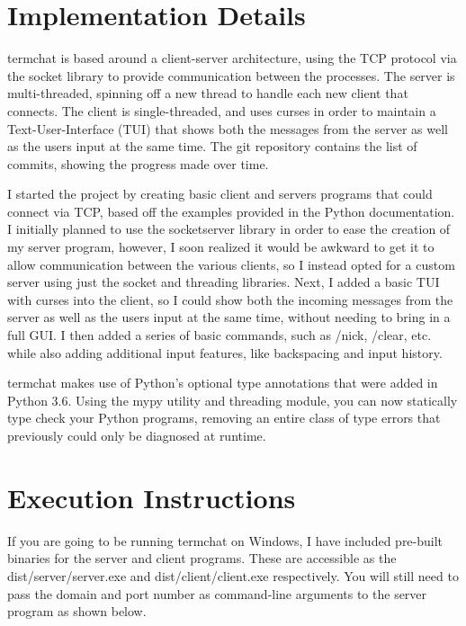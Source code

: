 \documentclass{article}
\begin{document}
    \section{Implementation Details}
    termchat is based around a client-server architecture, using the TCP
    protocol via the socket library to provide communication between the
    processes. The server is multi-threaded, spinning off a new thread to handle
    each new client that connects. The client is single-threaded, and uses
    curses in order to maintain a Text-User-Interface (TUI) that shows both the
    messages from the server as well as the users input at the same time. The
    git repository contains the list of commits, showing the progress made over
    time.

    I started the project by creating basic client and servers programs that
    could connect via TCP, based off the examples provided in the Python
    documentation. I initially planned to use the socketserver library in order
    to ease the creation of my server program, however, I soon realized it would
    be awkward to get it to allow communication between the various clients, so
    I instead opted for a custom server using just the socket and threading
    libraries. Next, I added a basic TUI with curses into the client, so I could
    show both the incoming messages from the server as well as the users input
    at the same time, without needing to bring in a full GUI. I then added a
    series of basic commands, such as /nick, /clear, etc. while also adding
    additional input features, like backspacing and input history.

    termchat makes use of Python's optional type annotations that were added in
    Python 3.6. Using the mypy utility and threading module, you can now
    statically type check your Python programs, removing an entire class of type
    errors that previously could only be diagnosed at runtime.

    \section{Execution Instructions} 
    If you are going to be running termchat on Windows, I have included
    pre-built binaries for the server and client programs. These are accessible
    as the dist/server/server.exe and dist/client/client.exe respectively. You
    will still need to pass the domain and port number as command-line arguments
    to the server program as shown below.
\end{document}
